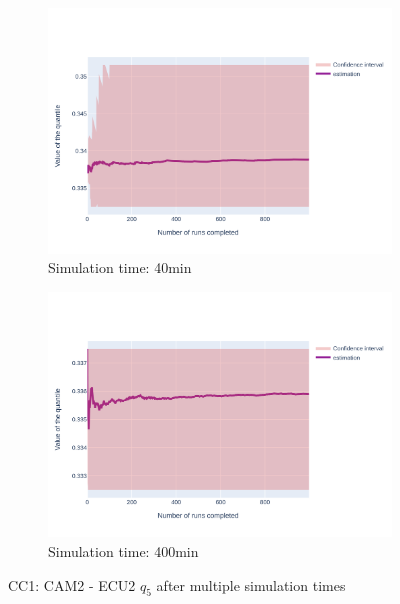 \documentclass{article}
\begin{document}
\begin{figure}[H]
\begin{subfigure}{.495\textwidth}
        \vspace{.5cm}
    \end{subfigure}
    \begin{subfigure}{.495\textwidth}
        \centering
        \includegraphics[width=\textwidth]{../fig/quantile5/CC1: CAM2 --> ECU2_40mn.png}
        \caption{Simulation time: 40min}
    \end{subfigure}
    \begin{subfigure}{.495\textwidth}
        \centering
        \includegraphics[width=\textwidth]{../fig/quantile5/CC1: CAM2 --> ECU2_400mn.png}
        \caption{Simulation time: 400min}
    \end{subfigure}
    \caption{CC1: CAM2 - ECU2 $q_5$ after multiple simulation times}
\end{figure}
\end{document}
